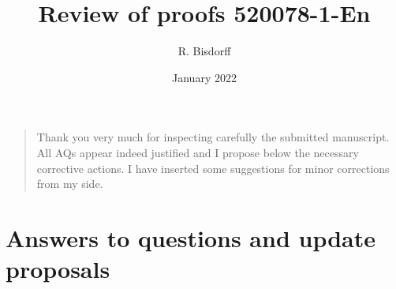\documentclass[english]{article}
\begin{document}
\author{R. Bisdorff}

\title{Review of proofs 520078-1-En}

\date{January 2022}

\maketitle
{}

\begin{quotation} \noindent Thank you very much for inspecting carefully the submitted manuscript. All AQs appear indeed justified and I propose below the necessary corrective actions. I have inserted some suggestions for minor corrections from my side. 
\end{quotation}

\section*{Answers to questions and update proposals}
\end{document}
